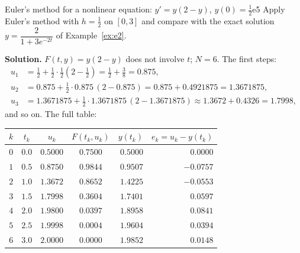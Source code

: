 \documentclass[11pt]{article}
\begin{document}
\begin{exmp}{Euler's method for a nonlinear equation: $y'=y(2-y)$, $y(0)=\frac12$}{e5}
Apply Euler's method with $h=\frac12$ on $[0,3]$ and compare with the exact solution $y=\dfrac2{1+3e^{-2t}}$ of Example~\ref{ex:e2}.

\textbf{Solution.} $F(t,y)=y(2-y)$ does not involve $t$; $N=6$. The first steps:
\begin{align*}
u_1&=\tfrac12+\tfrac12\cdot\tfrac12\left(2-\tfrac12\right)=\tfrac12+\tfrac38=0.875,\\
u_2&=0.875+\tfrac12\cdot0.875\,(2-0.875)=0.875+0.4921875=1.3671875,\\
u_3&=1.3671875+\tfrac12\cdot1.3671875\,(2-1.3671875)\approx1.3672+0.4326=1.7998,
\end{align*}
and so on. The full table:
\begin{center}
\begin{tabular}{ccccrr}
\toprule $k$ & $t_k$ & $u_k$ & $F(t_k,u_k)$ & $y(t_k)$ & $e_k=u_k-y(t_k)$ \\\midrule
$0$ & $0.0$ & $0.5000$ & $0.7500$ & $0.5000$ & $0.0000$\\
$1$ & $0.5$ & $0.8750$ & $0.9844$ & $0.9507$ & $-0.0757$\\
$2$ & $1.0$ & $1.3672$ & $0.8652$ & $1.4225$ & $-0.0553$\\
$3$ & $1.5$ & $1.7998$ & $0.3604$ & $1.7401$ & $0.0597$\\
$4$ & $2.0$ & $1.9800$ & $0.0397$ & $1.8958$ & $0.0841$\\
$5$ & $2.5$ & $1.9998$ & $0.0004$ & $1.9604$ & $0.0394$\\
$6$ & $3.0$ & $2.0000$ & $0.0000$ & $1.9852$ & $0.0148$\\
\bottomrule

\end{tabular}
\end{center}
\end{exmp}
\end{document}
